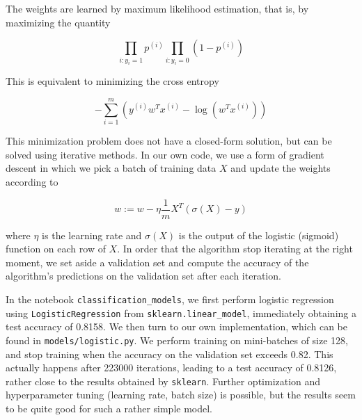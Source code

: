 \documentclass{article}
\begin{document}
The weights are learned by maximum likelihood estimation, that is, by maximizing the quantity

\begin{equation}
    \prod_{i: y_i=1}{p^{(i)}}\prod_{i: y_i=0}{(1 - p^{(i)})}
\end{equation}

This is equivalent to minimizing the cross entropy

\begin{equation}
    -\sum_{i=1}^{m}{(y^{(i)} w^T x^{(i)} - \log(w^T x^{(i)}))}
\end{equation}

This minimization problem does not have a closed-form solution, but can be solved using iterative methods. In our own code, we use a form of gradient descent in which we pick a batch of training data $X$ and update the weights according to

\begin{equation}
    w:= w - \eta \frac{1}{m} X^T (\sigma(X) - y)
\end{equation}

where $\eta$ is the learning rate and $\sigma(X)$ is the output of the logistic (sigmoid) function on each row of $X$. In order that the algorithm stop iterating at the right moment, we set aside a validation set and compute the accuracy of the algorithm's predictions on the validation set after each iteration.

In the notebook \texttt{classification\_models}, we first perform logistic regression using \texttt{LogisticRegression} from \texttt{sklearn.linear\_model}, immediately obtaining a test accuracy of 0.8158. We then turn to our own implementation, which can be found in \texttt{models/logistic.py}. We perform training on mini-batches of size 128, and stop training when the accuracy on the validation set exceeds 0.82. This actually happens after 223000 iterations, leading to a test accuracy of 0.8126, rather close to the results obtained by \texttt{sklearn}. Further optimization and hyperparameter tuning (learning rate, batch size) is possible, but the results seem to be quite good for such a rather simple model.
\end{document}
